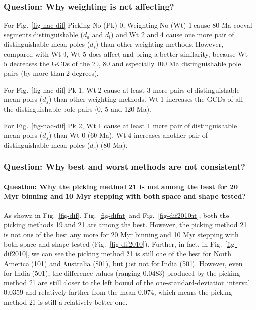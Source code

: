 \subsubsection{Question: Why weighting is not affecting?}

For Fig.~\ref{fig-nac-dif} Picking No (Pk) 0, Weighting No (Wt) 1
cause 80 Ma coeval segments distinguishable ($d_a$ and $d_l$) and
Wt 2 and 4 cause one more pair of distinguishable mean poles ($d_s$) than other
weighting methods. However, compared with Wt 0, Wt 5 does affect and bring a
better similarity, because Wt 5 decreases the GCDs of the 20, 80 and especially
100 Ma distinguishable pole pairs (by more than 2 degrees).

For Fig.~\ref{fig-nac-dif} Pk 1, Wt 2 cause at least 3 more pairs of
distinguishable mean poles ($d_s$) than other weighting methods. Wt 1 increases
the GCDs of all the distinguishable pole pairs (0, 5 and 120 Ma).

For Fig.~\ref{fig-nac-dif} Pk 2, Wt 1 cause at least 1 more pair of
distinguishable mean poles ($d_s$) than Wt 0 (60 Ma). Wt 4 increases another
pair of distinguishable mean poles ($d_s$) (80 Ma).


\subsubsection{Question: Why best and worst methods are not consistent?}
\paragraph{Question: Why the picking method 21 is not among the best for
20 Myr binning and 10 Myr stepping with both space and shape tested?}

As shown in Fig.~\ref{fig-dif}, Fig.~\ref{fig-difnt} and
Fig.~\ref{fig-dif2010nt}, both the picking methods 19 and 21 are among the
best. However, the picking method 21 is not one of the best any more for 20 Myr
binning and 10 Myr stepping with both space and shape tested
(Fig.~\ref{fig-dif2010}). Further, in fact, in Fig.~\ref{fig-dif2010}, we can
see the picking method 21 is still one of the best for North America (101) and
Australia (801), but just not for India (501). However, even for India (501),
the difference values (ranging 0.0483) produced by the picking
method 21 are still closer to the left bound of the one-standard-deviation
interval 0.0359 and relatively farther from the mean 0.074,
which means the picking method 21 is still a relatively better one.

